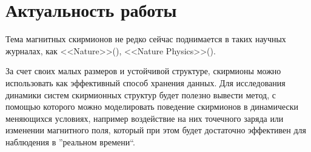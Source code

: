 \section{Актуальность работы}
Тема магнитных скирмионов не редко сейчас поднимается в таких научных журналах,
как <<Nature>>(\cite{Yu2010}), <<Nature Physics>>(\cite{Liang2016}).

За счет своих малых размеров и устойчивой структуре, скирмионы можно
использовать как эффективный способ хранения данных. Для исследования динамики
систем скирмионных структур будет полезно вывести метод, с помощью которого
можно моделировать поведение скирмионов в динамически меняющихся условиях,
например воздействие на них точечного заряда или изменении магнитного поля,
который при этом будет достаточно эффективен для наблюдения в ''реальном
времени``.

